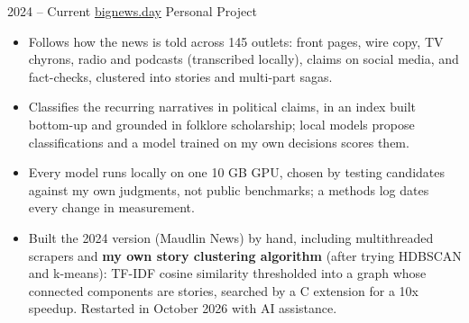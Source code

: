 \documentclass[9pt]{developercv} %
\begin{document}

\begin{entrylist}
    \entry
        {2024 -- Current}
        {\href{https://bignews.day}{bignews.day}}
        {Personal Project}
        {
            \slashsep
            \slashsep
            \slashsep
            \slashsep
            \slashsep
            \begin{itemize}[leftmargin=*, noitemsep, topsep=2pt]
            \item Follows how the news is told across 145 outlets: front pages, wire copy, TV chyrons, radio and podcasts (transcribed locally), claims on social media, and fact-checks, clustered into stories and multi-part sagas.
            \item Classifies the recurring narratives in political claims, in an index built bottom-up and grounded in folklore scholarship; local models propose classifications and a model trained on my own decisions scores them.
            \item Every model runs locally on one 10 GB GPU, chosen by testing candidates against my own judgments, not public benchmarks; a methods log dates every change in measurement.
            \item Built the 2024 version (Maudlin News) by hand, including multithreaded scrapers and \textbf{my own story clustering algorithm} (after trying HDBSCAN and k-means): TF-IDF cosine similarity thresholded into a graph whose connected components are stories, searched by a C extension for a 10x speedup. Restarted in October 2026 with AI assistance.
            \end{itemize}
        }
\end{entrylist}


\begin{entrylist}
\end{entrylist}
\end{document}
